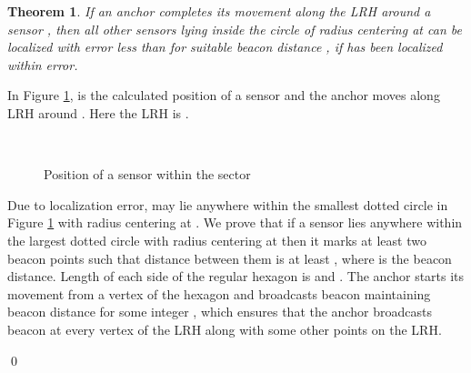 \documentclass[preprint,11pt]{elsarticle}
\newtheorem{theorem}{Theorem}
\newenvironment{proof}{\noindent{\bf Proof: }}{\qed \smallbreak}
\begin{document}
\begin{theorem}
\label{the2:localz}
If an anchor completes its movement along the LRH around a sensor , then all other sensors lying inside the circle of radius  centering at  can be localized with error less than  for suitable beacon distance ,
if  has been localized within  error.
\end{theorem}
\begin{proof}
In Figure \ref{f:fig5},  is the calculated position of a sensor and the anchor moves along LRH around .
Here the LRH is .
\begin{figure}[h]
    \centering
     ~~~~~~~~~
\caption{Position of a sensor within the sector }\label{f:fig5}
\end{figure}
Due to localization error,  may lie anywhere within the smallest dotted circle in Figure \ref{f:fig5}
with radius  centering at .
We prove that if a sensor lies anywhere within the largest dotted circle with radius  centering at 
then it marks at least  two beacon points such that distance between them is at least , where  is the beacon
distance. Length of each side of the regular hexagon  is  and . The anchor starts
its movement from a vertex of the hexagon and broadcasts beacon maintaining beacon distance  for some integer ,
which ensures that the anchor broadcasts beacon at every vertex of the LRH along with some other points on the LRH.


\end{proof}
\end{document}
